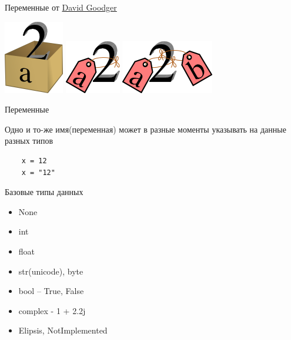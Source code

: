 \documentclass{article}
\begin{document}
\begin{center} Переменные от 
\href{http://python.net/~goodger/projects/pycon/2007/idiomatic/handout.html}{David Goodger}
\end{center}
\includegraphics{images/a2box.png} \hspace{3cm}
\includegraphics{images/a2tag.png} \hspace{3cm}
\includegraphics{images/ab2tag.png} \\
\newpage

\begin{center} Переменные \end{center}
Одно и то-же имя(переменная) может в разные моменты указывать на данные разных типов
\vspace{15pt}
\begin{lstlisting}
	x = 12
	x = "12"
\end{lstlisting}
\newpage

\begin{center} Базовые типы данных \end{center}
\begin{itemize}
	\item None
	\item int
	\item float
	\item str(unicode), byte
	\item bool – True, False
	\item complex - 1 + 2.2j
	\item Elipsis, NotImplemented
\end{itemize}
\newpage
\end{document}
